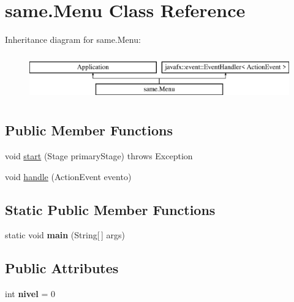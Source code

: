 \hypertarget{classsame_1_1_menu}{}\section{same.\+Menu Class Reference}
\label{classsame_1_1_menu}
Inheritance diagram for same.\+Menu\+:\begin{figure}[H]
\begin{center}
\leavevmode
\includegraphics[height=2.000000cm]{classsame_1_1_menu}
\end{center}
\end{figure}
\subsection*{Public Member Functions}
\begin{DoxyCompactItemize}
\item 
void \hyperlink{classsame_1_1_menu_a6fa1dc5d1236ff823c8f137c30f086de}{start} (Stage primary\+Stage)  throws Exception 
\item 
void \hyperlink{classsame_1_1_menu_a5c930cf789ca6c4eee4dd807f451f75a}{handle} (Action\+Event evento)
\end{DoxyCompactItemize}
\subsection*{Static Public Member Functions}
\begin{DoxyCompactItemize}
\item 
\mbox{\label{classsame_1_1_menu_af20b4178839b52c4ce23a26bd90cb76e}} 
static void {\bfseries main} (String\mbox{[}$\,$\mbox{]} args)
\end{DoxyCompactItemize}
\subsection*{Public Attributes}
\begin{DoxyCompactItemize}
\item 
\mbox{\label{classsame_1_1_menu_a8e989c6afc3b541638143c11f5b7bf7b}} 
int {\bfseries nivel} = 0
\end{DoxyCompactItemize}


